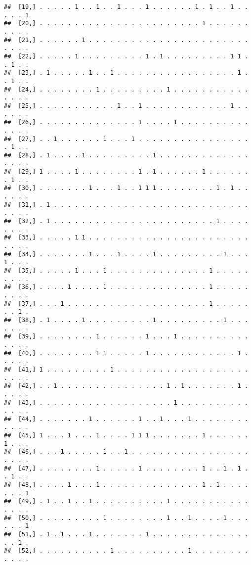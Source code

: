 \documentclass{article}\usepackage[]{graphicx}\usepackage[]{color}
\makeatletter
\newenvironment{kframe}{%
 \def\at@end@of@kframe{}%
 \ifinner\ifhmode%
  \def\at@end@of@kframe{\end{minipage}}%
  \begin{minipage}{\columnwidth}%
 \fi\fi%
 \def\FrameCommand##1{\hskip\@totalleftmargin \hskip-\fboxsep
 \colorbox{shadecolor}{##1}\hskip-\fboxsep
     \hskip-\linewidth \hskip-\@totalleftmargin \hskip\columnwidth}%
 \MakeFramed {\advance\hsize-\width
   \@totalleftmargin\z@ \linewidth\hsize
   \@setminipage}}%
 {\par\unskip\endMakeFramed%
 \at@end@of@kframe}
\newenvironment{knitrout}{}{} %
\makeatother
\begin{document}
\begin{knitrout}
\begin{kframe}
\begin{verbatim}
##  [19,] . . . . . 1 . . 1 . . 1 . . . 1 . . . . . . 1 . 1 . . 1 . . . . . 1
##  [20,] . . . . . . . . . . . . . . . . . . . . . . . 1 . . . . . . . . . .
##  [21,] . . . . . . 1 . . . . . . . . . . . . . . . . . . . . . . . . . . .
##  [22,] . . . . . 1 . . . . . . . . . 1 . 1 . . . . . . . . . 1 1 . . 1 . .
##  [23,] . 1 . . . . . 1 . . 1 . . . . . . . . . . . . . . . . . 1 . . 1 . .
##  [24,] . . . . . . . . 1 . . . . . . . . . 1 . . . . . . . . . . . . . . .
##  [25,] . . . . . . . . . . . 1 . . 1 . . . . . . . . . . . . 1 . . . . . .
##  [26,] . . . . . . . . . . . . . . 1 . . . . 1 . . . . . . . . . . . . . .
##  [27,] . . 1 . . . . . . 1 . . . 1 . . . . . . . . . . . . . . . . . 1 . .
##  [28,] . 1 . . . . 1 . . . . . . . . . 1 . . . . . . . . . . . . . . . . .
##  [29,] 1 . . . . 1 . . . . . . . . 1 . 1 . . . . . . 1 . . . . . . . 1 . .
##  [30,] . . . . . . . 1 . . . 1 . . 1 1 1 . . . . . . . . 1 . 1 . . . . . .
##  [31,] . 1 . . . . . . . . . . . . . . . . . . . . . . . . . . . . . . . .
##  [32,] . 1 . . . . . . . . . . . . . . . . . . . . . . . 1 . . . . . . . .
##  [33,] . . . . . 1 1 . . . . . . . . . . . . . . . . . . . . . . . . . . .
##  [34,] . . . . . . . 1 . . . 1 . . . . 1 . . . . . . . . . 1 . . . 1 . . .
##  [35,] . . . . . 1 . . . 1 . . . . . . . . . . . . . . 1 . . . . . . . . .
##  [36,] . . . . 1 . . . . 1 . . . . . . . . . . . . . . 1 . . . . . . . . .
##  [37,] . . . 1 . . . . . . . . . . . . . . . . . . . . 1 . . . . . . . 1 .
##  [38,] . 1 . . . . 1 . . . . . . . . . 1 . . . . . . . . . 1 . . . . . . .
##  [39,] . . . . . . . . 1 . . . . . . 1 . . . 1 . . . . . . . . . . . . . .
##  [40,] . . . . . . . . 1 1 . . . . . 1 . . . . . . . . . . . . 1 . . . . .
##  [41,] 1 . . . . . . . . . 1 . . . . . . . . . . . . . . . . . . . . . . .
##  [42,] . . 1 . . . . . . . . . . . . . . . 1 . 1 . . . . . . . 1 . . . . .
##  [43,] . . . . . . . . . . . . . . . . . . . 1 . . . . . . . . . . . . . .
##  [44,] . . . . . . . 1 . . . . . . 1 . . 1 . . . 1 . . . . . . . . . . . .
##  [45,] 1 . . . 1 . . . 1 . . . . 1 1 1 . . . . . . . 1 . . . . . . 1 . . .
##  [46,] . . . 1 . . . . . 1 . . 1 . . . . . . . . . . . . . . . . . . . . .
##  [47,] . . . . . . . . 1 . . . . . 1 . . . . . . . . 1 . . 1 . 1 . . 1 . .
##  [48,] . . . . 1 . . . 1 . . . . . . . . . . . . . . 1 . 1 . . . . . . . 1
##  [49,] . 1 . . 1 . . 1 . . . . . . . . . . 1 . . . . . . . . . . . . . . .
##  [50,] . . . . . . . . . 1 . . . . . . . . 1 . . 1 . . . . 1 . . . . . . 1
##  [51,] . 1 . 1 . . . 1 . . . . . . . 1 . . . . . . . . . . . . . . . . 1 .
##  [52,] . . . . . . . . . . 1 . . . . . . . . . . 1 . . . . . . . . . . . .

\end{verbatim}
\end{kframe}
\end{knitrout}
\end{document}
